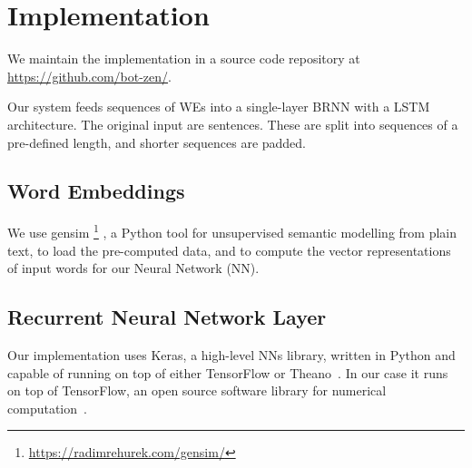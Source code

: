 \documentclass[11pt,a4paper]{article}
\begin{document}
\section{Implementation} %
\label{sec:implementation}

We maintain the implementation in a source code repository at
\url{https://github.com/bot-zen/}.  

Our system feeds sequences of WEs into a single-layer BRNN with a LSTM architecture. The original input are sentences. These are split into sequences of a pre-defined length, and shorter sequences are padded.


\subsection{Word Embeddings} %


We use gensim%
\footnote{\url{https://radimrehurek.com/gensim/}}%
, a Python tool for unsupervised semantic modelling from plain text, to load
the pre-computed data, and to compute the vector representations of
input words for our Neural Network (NN).

\subsection{Recurrent Neural Network Layer} %

Our implementation uses Keras, a high-level NNs library, written in Python and
capable of running on top of either TensorFlow or Theano~\cite{chollet2015}. 
In our case it runs on top of TensorFlow, an open source software library for numerical computation~\cite{tensorflow2016}.
\end{document}

